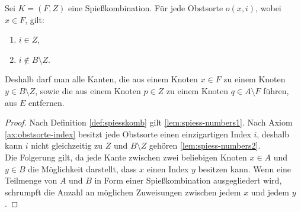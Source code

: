\begin{lemma} \label{lem:spiess-numbers}
Sei $K = (F, Z)$ eine Spießkombination. Für jede Obstsorte $o(x, i)$, wobei $x \in F$, gilt:
\begin{enumerate}[label={\upshape(\roman*)}]
  \item $i \in Z$, \label{lem:spiess-numbers1}
  \item $i \notin B \setminus Z$. \label{lem:spiess-numbers2}
\end{enumerate}   
Deshalb darf man alle Kanten, die aus einem Knoten $x \in F$ 
zu einem Knoten $y \in B \setminus Z$, sowie die aus einem Knoten $p \in Z$ zu
einem Knoten $q \in A \setminus F$ führen, aus $E$ entfernen.
\end{lemma}

\begin{proof}
Nach Definition \ref{def:spiesskomb} gilt \ref{lem:spiess-numbers1}. 
Nach Axiom \ref{ax:obstsorte-index} besitzt jede Obstsorte einen einzigartigen Index $i$,
deshalb kann $i$ nicht gleichzeitig zu $Z$ und $B \setminus Z$ gehören \ref{lem:spiess-numbers2}.\\
Die Folgerung gilt, da %
jede Kante zwischen zwei beliebigen Knoten $x \in A$ und $y \in B$ die Möglichkeit darstellt,
dass $x$ einen Index $y$ besitzen kann.
Wenn eine Teilmenge von $A$ und $B$ in Form einer Spießkombination ausgegliedert wird,
schrumpft die Anzahl an möglichen Zuweisungen zwischen jedem $x$ und jedem $y$. 
\end{proof}